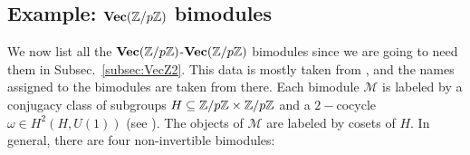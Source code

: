 
\subsection{Example: $\textbf{Vec}(\mathbb{Z}/p\mathbb{Z})$ bimodules}\label{sec:VecZp-bimodules}

We now list all the $\textbf{Vec}(\mathbb{Z}/p\mathbb{Z})$-$\textbf{Vec}(\mathbb{Z}/p\mathbb{Z})$ bimodules since we are going to need them in Subsec.~\ref{subsec:VecZ2}. This data is mostly taken from \cite{BBJ19}, and the names assigned to the bimodules are taken from there. Each bimodule $\mathcal{M}$ is labeled by a conjugacy class of subgroups $H\subseteq\mathbb{Z}/p\mathbb{Z}\times\mathbb{Z}/p\mathbb{Z}$ and a $2-$cocycle $\omega\in H^2(H,U(1))$ (see \cite{Etingof2015}). The objects of $\mathcal{M}$ are labeled by cosets of $H$. In general, there are four non-invertible bimodules: 
